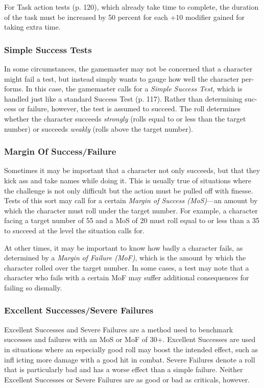 For Task action tests (p. 120), which already take 
time to complete, the duration of the task must be 
increased by 50 percent for each +10 modifier gained 
for taking extra time.

\subsubsection{Simple Success Tests}

In some circumstances, the gamemaster may not be 
concerned that a character might fail a test, but instead 
simply wants to gauge how well the character per-
forms. In this case, the gamemaster calls for a \textit{Simple }
\textit{Success Test,} which is handled just like a standard 
Success Test (p. 117). Rather than determining suc-
cess or failure, however, the test is assumed to succeed. 
The roll determines whether the character succeeds 
\textit{strongly }(rolls equal to or less than the target number) 
or succeeds \textit{weakly }(rolls above the target number).

\subsubsection{Margin Of Success/Failure}

Sometimes it may be important that a character not 
only succeeds, but that they kick ass and take names 
while doing it. This is usually true of situations where 
the challenge is not only difficult but the action must 
be pulled off with finesse. Tests of this sort may call 
for a certain \textit{Margin of Success (MoS)}—an amount by 
which the character must roll under the target number. 
For example, a character facing a target number of 55 
and a MoS of 20 must roll equal to or less than a 35 
to succeed at the level the situation calls for.

At other times, it may be important to know how 
badly a character fails, as determined by a \textit{Margin }
\textit{of Failure (MoF)}, which is the amount by which the 
character rolled over the target number. In some cases, 
a test may note that a character who fails with a 
certain MoF may suffer additional consequences for 
failing so dismally.

\subsubsection{Excellent Successes/Severe Failures}

Excellent Successes and Severe Failures are a method 
used to benchmark successes and failures with an 
MoS or MoF of 30+. Excellent Successes are used in 
situations where an especially good roll may boost the 
intended effect, such as infl icting more damage with 
a good hit in combat. Severe Failures denote a roll 
that is particularly bad and has a worse effect than a 
simple failure. Neither Excellent Successes or Severe 
Failures are as good or bad as criticals, however.

